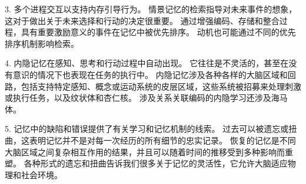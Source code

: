 3. 多个进程交互以支持内存引导行为。
情景记忆的检索指导对未来事件的想象，这对于做出关于未来选择和行动的决定很重要。
通过增强编码、存储和整合过程，具有重要激励意义的事件在记忆中被优先排序。
动机也可能通过不同的优先排序机制影响检索。 


4. 内隐记忆在感知、思考和行动过程中自动出现。
它往往是不灵活的，甚至在没有意识的情况下也表现在任务的执行中。
内隐记忆涉及各种各样的大脑区域和回路，包括支持特定感知、概念或运动系统的皮层区域，这些系统被招募来处理刺激或执行任务，以及纹状体和杏仁核。
涉及关系关联编码的内隐学习还涉及海马体。


5. 记忆中的缺陷和错误提供了有关学习和记忆机制的线索。
过去可以被遗忘或扭曲，这表明记忆并不是对每一次经历的所有细节的忠实记录。
恢复的记忆是不同大脑区域之间复杂相互作用的结果，并且可以随着时间的推移受到多种影响而重塑。
各种形式的遗忘和扭曲告诉我们很多关于记忆的灵活性，它允许大脑适应物理和社会环境。


